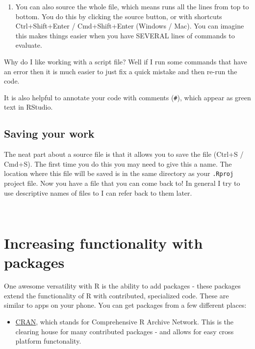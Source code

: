 \documentclass[
]{book}
\providecommand{\tightlist}{%
  \setlength{\itemsep}{0pt}\setlength{\parskip}{0pt}}
\theoremstyle{definition}
\theoremstyle{definition}
\theoremstyle{definition}
\theoremstyle{remark}
\begin{document}
\begin{enumerate}
\def\labelenumi{\arabic{enumi}.}
\setcounter{enumi}{2}
\tightlist
\item
  You can also source the whole file, which means runs all the lines from top to bottom. You do this by clicking the source button, or with shortcuts Ctrl+Shift+Enter / Cmd+Shift+Enter (Windows / Mac). You can imagine this makes things easier when you have SEVERAL lines of commands to evaluate.
\end{enumerate}

Why do I like working with a script file? Well if I run some commands that have an error then it is much easier to just fix a quick mistake and then re-run the code.

It is also helpful to annotate your code with comments (\texttt{\#}), which appear as green text in RStudio.

\hypertarget{saving-your-work}{%
\subsection{Saving your work}\label{saving-your-work}}

The neat part about a source file is that it allows you to save the file (Ctrl+S / Cmd+S). The first time you do this you may need to give this a name. The location where this file will be saved is in the same directory as your \texttt{.Rproj} project file. Now you have a file that you can come back to! In general I try to use descriptive names of files to I can refer back to them later.

~

\hypertarget{increasing-functionality-with-packages}{%
\section{Increasing functionality with packages}\label{increasing-functionality-with-packages}}

One awesome versatility with R is the ability to add packages - these packages extend the functionality of R with contributed, specialized code. These are similar to apps on your phone. You can get packages from a few different places:

\begin{itemize}
\tightlist
\item
  \href{https://cran.r-project.org/}{CRAN}, which stands for Comprehensive R Archive Network. This is the clearing house for many contributed packages - and allows for easy cross platform functonality.
\end{itemize}
\end{document}

